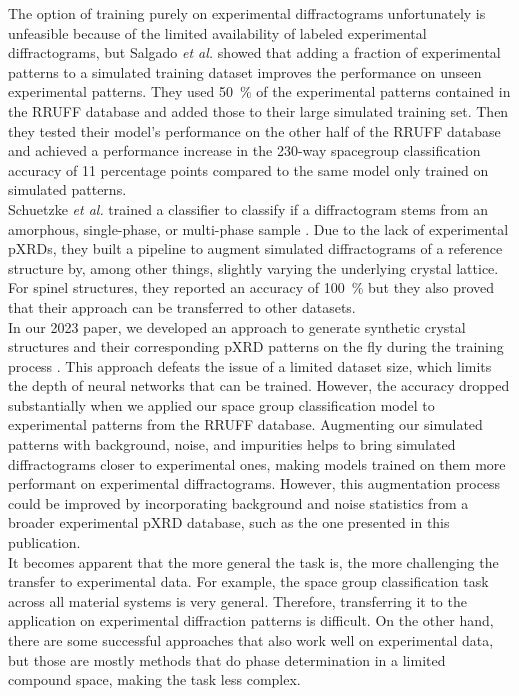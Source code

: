 The option of training purely on experimental diffractograms unfortunately is unfeasible because of the limited availability of labeled experimental diffractograms, but Salgado {\it et al.} \cite{Salgado2023} showed that adding a fraction of experimental patterns to a simulated training dataset improves the performance on unseen experimental patterns. They used \SI{50}{\percent} of the experimental patterns contained in the RRUFF database and added those to their large simulated training set. Then they tested their model's performance on the other half of the RRUFF database and achieved a performance increase in the 230-way spacegroup classification accuracy of \num{11} percentage points compared to the same model only trained on simulated patterns. \\

Schuetzke {\it et al.} trained a classifier to classify if a diffractogram stems from an amorphous, single-phase, or multi-phase sample \cite{Schuetzke2024}. Due to the lack of experimental pXRDs, they built a pipeline to augment simulated diffractograms of a reference structure by, among other things, slightly varying the underlying crystal lattice. For spinel structures, they reported an accuracy of \SI{100}{\percent} but they also proved that their approach can be transferred to other datasets.\\

In our 2023 paper, we developed an approach to generate synthetic crystal structures and their corresponding pXRD patterns on the fly during the training process \cite{Schopmans2023}. This approach defeats the issue of
a limited dataset size, which limits the depth of neural networks that can be trained. However, the accuracy dropped substantially when we applied our space group classification model to experimental patterns from the RRUFF database. Augmenting our simulated patterns with background, noise, and impurities helps to bring simulated diffractograms closer to experimental ones, making models trained on them more performant on experimental diffractograms. However, this augmentation process could be improved by incorporating background and noise statistics from a broader experimental pXRD database, such as the one presented in this publication.\\

It becomes apparent that the more general the task is, the more challenging the transfer to experimental data. For example, the space group classification task across all material systems is very general. Therefore, transferring it to the application on experimental diffraction patterns is difficult. \cite{Schopmans2023, Lee2022, Vecsei2018} On the other hand, there are some successful approaches that also work well on experimental data, but those are mostly methods that do phase determination in a limited compound space, making the task less complex. \cite{Schuetzke2024, Lee2020}\\

